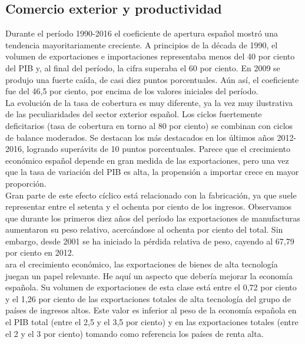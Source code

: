     \subsection{Comercio exterior y productividad}
    Durante el período 1990-2016 el coeficiente de apertura español mostró una tendencia mayoritariamente creciente. A principios de la década de 1990, el volumen de exportaciones e importaciones representaba menos del 40 por ciento del PIB y, al final del período, la cifra superaba el 60 por ciento. En 2009 se produjo una fuerte caída, de casi diez puntos porcentuales. Aún así, el coeficiente fue del 46,5 por ciento, por encima de los valores iniciales del período.\\
    La evolución de la tasa de cobertura es muy diferente, ya la vez muy ilustrativa de las peculiaridades del sector exterior español. Los ciclos fuertemente deficitarios (tasa de cobertura en torno al 80 por ciento) se combinan con ciclos de balance moderados. Se destacan los más destacados en los últimos años 2012-2016, logrando superávits de 10 puntos porcentuales. Parece que el crecimiento económico español depende en gran medida de las exportaciones, pero una vez que la tasa de variación del PIB es alta, la propensión a importar crece en mayor proporción.\\
    Gran parte de este efecto cíclico está relacionado con la fabricación, ya que suele representar entre el setenta y el ochenta por ciento de los ingresos. Observamos que durante los primeros diez años del período las exportaciones de manufacturas aumentaron su peso relativo, acercándose al ochenta por ciento del total. Sin embargo, desde 2001 se ha iniciado la pérdida relativa de peso, cayendo al 67,79 por ciento en 2012.\\
    ara el crecimiento económico, las exportaciones de bienes de alta tecnología juegan un papel relevante. He aquí un aspecto que debería mejorar la economía española. Su volumen de exportaciones de esta clase está entre el 0,72 por ciento y el 1,26 por ciento de las exportaciones totales de alta tecnología del grupo de países de ingresos altos. Este valor es inferior al peso de la economía española en el PIB total (entre el 2,5 y el 3,5 por ciento) y en las exportaciones totales (entre el 2 y el 3 por ciento) tomando como referencia los países de renta alta.\\

